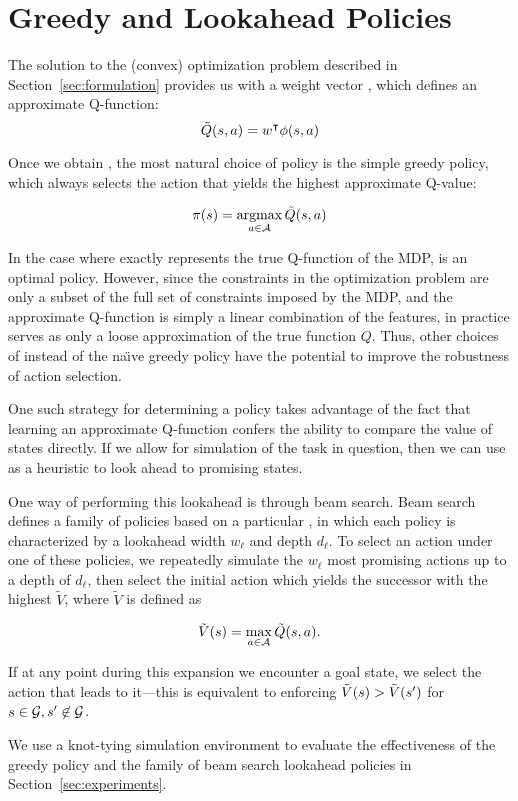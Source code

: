 \section{Greedy and Lookahead Policies}

The solution to the (convex) optimization problem described in 
Section~\ref{sec:formulation} provides us with a weight vector \weights{}, which defines 
an approximate Q-function:
\begin{equation}
  \tilde{Q}(s,a) = w^\intercal \phi({s}, {a})
\end{equation}

Once we obtain \approxq{}, the most natural choice of policy is the
simple greedy policy, which always selects the action that yields the highest
approximate Q-value:

\begin{equation}
  \pi(s) = \operatorname*{argmax}_{a \in \mathcal{A}} \tilde{Q}(s,a)
\end{equation}

In the case where \approxq{} exactly represents the true Q-function of the MDP,
\policyvar{} is an optimal policy. However, since the constraints in the optimization
problem are only a subset of the full set of constraints imposed by the MDP, and
the approximate Q-function is simply a linear combination of the features, in
practice \approxq{} serves as only a loose approximation of the true function
$Q$. Thus, other choices of \policyvar{} instead of the na\"{\i}ve greedy
policy have the potential to improve the robustness of action selection.

One such strategy for determining a policy takes advantage of the fact that
learning an approximate Q-function confers the ability to compare the value of
states directly. If we allow for simulation of the task in question, then we can
use \approxq{} as a heuristic to look ahead to promising states.

One way of performing this lookahead is through beam search. Beam search defines
a family of policies based on a particular \approxq{}, in which each policy is
characterized by a lookahead width $w_\ell$ and depth $d_\ell$. To select an action under
one of these policies, we repeatedly simulate the $w_\ell$ most promising actions up
to a depth of $d_\ell$, then select the initial action which yields the successor
with the highest $\tilde{V}$, where $\tilde{V}$ is defined as

\begin{equation}
  \tilde{V}(s) = \max_{a \in \mathcal{A}} \tilde{Q}(s, a).
\end{equation}


If at any point during this expansion we encounter a goal state, we select the
action that leads to it---this is equivalent to enforcing
$\tilde{V}(s{}) > \tilde{V}(s{}')$ for $s{} \in
\mathcal{G}{}, s{}' \not\in \mathcal{G}{}$.

We use a knot-tying simulation environment to evaluate the effectiveness of the
greedy policy and the family of beam search lookahead policies in
Section~\ref{sec:experiments}.
